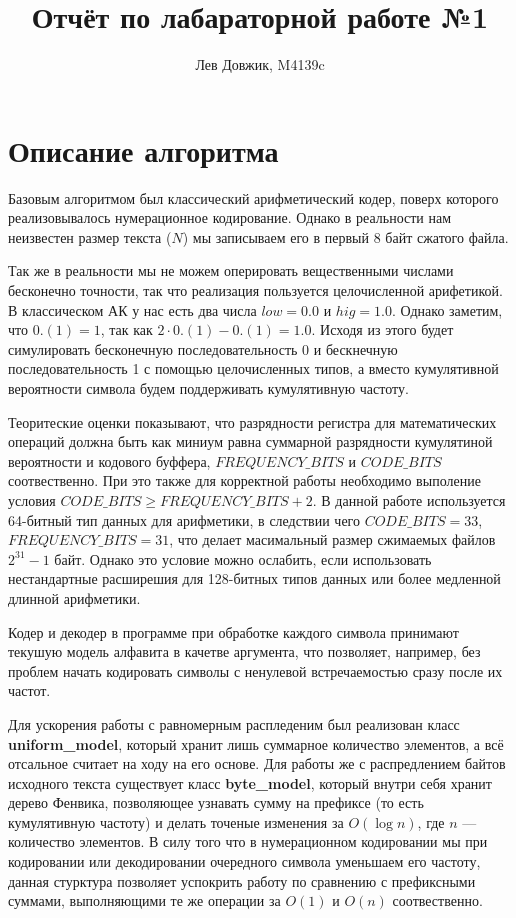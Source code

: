 \documentclass[fontsize=13pt]{article}
\title{Отчёт по лабараторной работе №1}
\author{Лев Довжик, M4139c}
\date{}
\begin{document}
	\maketitle

\section*{Описание алгоритма}

Базовым алгоритмом был классический арифметический кодер, поверх которого реализовывалось нумерационное кодирование. Однако в реальности нам неизвестен размер текста ($N$) мы записываем его в первый 8 байт сжатого файла.

Так же в реальности мы не можем оперировать вещественными числами бесконечно точности, так что реализация пользуется целочисленной арифетикой. В классическом АК у нас есть два числа $low = 0.0$ и $hig = 1.0$. Однако заметим, что $0.(1) = 1$, так как $2 \cdot 0.(1) - 0.(1) = 1.0$. Исходя из этого будет симулировать бесконечную последовательность 0 и бескнечную последовательность 1 с помощью целочисленных типов, а вместо кумулятивной вероятности символа будем поддерживать кумулятивную частоту.

Теоритеские оценки показывают, что разрядности регистра для математических операций должна быть как миниум равна суммарной разрядности кумулятиной вероятности  и кодового буффера, $FREQUENCY\_BITS$ и $CODE\_BITS$ соотвественно. При это также для корректной работы необходимо выполение условия $CODE\_BITS \geq FREQUENCY\_BITS + 2$. В данной работе используется 64-битный тип данных для арифметики, в следствии чего $CODE\_BITS = 33$, $FREQUENCY\_BITS = 31$, что делает масимальный размер сжимаемых файлов $2^{31} - 1$ байт. Однако это условие можно ослабить, если использовать нестандартные расширешия для 128-битных типов данных или более медленной длинной арифметики.

Кодер и декодер в программе при обработке каждого символа принимают текушую модель алфавита в качетве аргумента, что позволяет, например, без проблем начать кодировать символы с ненулевой встречаемостью сразу после их частот.

Для ускорения работы с равномерным распледеним был реализован класс \textbf{uniform\_model}, который хранит лишь суммарное количество элементов, а всё отсальное считает на ходу на его основе. Для работы же с распредлением байтов исходного текста существует класс \textbf{byte\_model}, который внутри себя хранит дерево Фенвика, позволяющее узнавать сумму на префиксе (то есть кумулятивную частоту) и делать точеные изменения за $O(\log n)$, где $n$ --- количество элементов. В силу того что в нумерационном кодировании мы при кодировании или декодировании очередного символа уменьшаем его частоту, данная стурктура позволяет успокрить работу по сравнению с префиксными суммами, выполняющими те же операции за $O(1)$ и $O(n)$ соотвественно.
\end{document}
